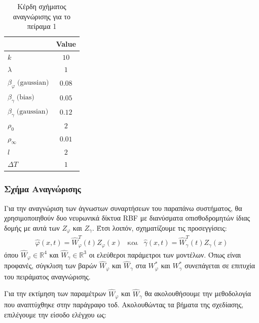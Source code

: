 {\begin{table}
	\centering
	\captionsetup{format=plain}
	\caption{Κέρδη σχήματος αναγνώρισης για το πείραμα 1}
	\label{tab:rbf_siso_params}
	\begin{tabular}{ l | c }
		\hline\hline
		\text{Parameter} & Value \\ \hline\hline
		$k$             & $10$   \\ \hline
		$\lambda$       & $1 $   \\ \hline
		$\beta_{\varphi} \;\text{(gaussian)}$  & $0.08$ \\ \hline
		$\beta_{\gamma} \;\text{(bias)}$     & $0.05$ \\ \hline
		$\beta_{\gamma} \;\text{(gaussian)}$ & $0.12$  \\ \hline
		$\rho_0      $ & $2$  \\ \hline
		$\rho_\infty $ & $0.01$  \\ \hline
		$l           $ & $2$  \\ \hline
		$\textit{ΔΤ} $  & $1$ 	\\ \hline \hline	
	\end{tabular}
\end{table}


\subsubsection{Σχήμα Αναγνώρισης}
Για την αναγνώριση των άγνωστων συναρτήσεων του παραπάνω συστήματος, θα χρησιμοποιηθούν δυο νευρωνικά δίκτυα RBF με διανύσματα  οπισθοδρομητών ίδιας δομής με αυτά των $Z_\varphi$ και $Z_\gamma$. Έτσι λοιπόν, σχηματίζουμε τις προσεγγίσεις:
\begin{equation*}
	\begin{matrix}
	\hat{\varphi}(x,t)  = \hat{W}_{\varphi}^T(t) Z_\varphi(x) & \text{και} & \hat{\gamma}(x,t) = \hat{W}_{\gamma}^T(t) Z_\gamma(x) 
	\end{matrix}
\end{equation*}
όπου $\hat{W}_{\varphi} \in \mathbb{R}^4$ και $\hat{W}_{\gamma} \in \mathbb{R}^3$ οι ελεύθεροι παράμετροι των μοντέλων. Όπως είναι προφανές, σύγκλιση των βαρών $\hat{W}_{\varphi}$ και $\hat{W}_{\gamma}$ στα $W_{\varphi}^*$ και $W_{\gamma}^*$ συνεπάγεται σε επιτυχία του πειράματος αναγνώρισης.

Για την εκτίμηση των παραμέτρων $\hat{W}_{\varphi}$ και $\hat{W}_{\gamma}$ θα ακολουθήσουμε την μεθοδολογία που αναπτύχθηκε στην παράγραφο τοδ. Ακολουθώντας τα βήματα της σχεδίασης, επιλέγουμε την είσοδο ελέγχου ως:

}
